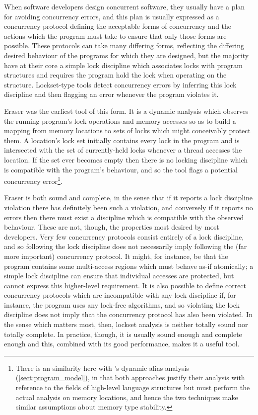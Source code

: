 When software developers design concurrent software, they usually have
a plan for avoiding concurrency errors, and this plan is usually
expressed as a concurrency protocol defining the acceptable forms of
concurrency and the actions which the program must take to ensure that
only those forms are possible.  These protocols can take many
differing forms, reflecting the differing desired behaviour of the
programs for which they are designed, but the majority have at their
core a simple lock discipline which associates locks with program
structures and requires the program hold the lock when operating on
the structure.  Lockset-type tools detect concurrency errors by
inferring this lock discipline and then flagging an error whenever the
program violates it.

Eraser\cite{Savage1997} was the earliest tool of this form.  It is a
dynamic analysis which observes the running program's lock operations
and memory accesses so as to build a mapping from memory locations to
sets of locks which might conceivably protect them.  A location's lock
set initially contains every lock in the program and is intersected
with the set of currently-held locks whenever a thread accesses the
location.  If the set ever becomes empty then there is no locking
discipline which is compatible with the program's behaviour, and so
the tool flags a potential concurrency error\footnote{There is an
  similarity here with {\technique}'s dynamic alias analysis
  (\autoref{sect:program_model}), in that both approaches justify
  their analysis with reference to the fields of high-level language
  structures but must perform the actual analysis on memory locations,
  and hence the two techniques make similar assumptions about memory
  type stability.}.

Eraser is both sound and complete, in the sense that if it reports a
lock discipline violation there has definitely been such a violation,
and conversely if it reports no errors then there must exist a
discipline which is compatible with the observed behaviour.  These are
not, though, the properties most desired by most developers.  Very few
concurrency protocols consist entirely of a lock discipline, and so
following the lock discipline does not necessarily imply following the
(far more important) concurrency protocol.  It might, for instance, be
that the program contains some multi-access regions which must behave
as-if atomically; a simple lock discipline can ensure that individual
accesses are protected, but cannot express this higher-level
requirement.  It is also possible to define correct concurrency
protocols which are incompatible with any lock discipline if, for
instance, the program uses any lock-free algorithms, and so violating
the lock discipline does not imply that the concurrency protocol has
also been violated.  In the sense which matters most, then, lockset
analysis is neither totally sound nor totally complete.  In practice,
though, it is usually sound enough and complete enough and this,
combined with its good performance, makes it a useful tool.

